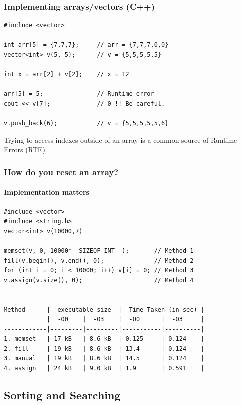 \documentclass{beamer}
\begin{document}
\begin{frame}[fragile]
  \frametitle{Implementing arrays/vectors (C++)}
  {\small
\begin{verbatim}
#include <vector>         

int arr[5] = {7,7,7};     // arr = {7,7,7,0,0}
vector<int> v(5, 5);      // v = {5,5,5,5,5}

int x = arr[2] + v[2];    // x = 12

arr[5] = 5;               // Runtime error
cout << v[7];             // 0 !! Be careful.

v.push_back(6);           // v = {5,5,5,5,5,6}
\end{verbatim}
  }

  \begin{alertblock}{}
    Trying to access indexes outside of an array is a common source of
    Runtime Errors (RTE)
  \end{alertblock}

\end{frame}

\begin{frame}[fragile]
  \frametitle{How do you reset an array?}
  \framesubtitle{Implementation matters}
{\small
\begin{verbatim}
#include <vector>
#include <string.h>
vector<int> v(10000,7)

memset(v, 0, 10000*__SIZEOF_INT__);       // Method 1
fill(v.begin(), v.end(), 0);              // Method 2
for (int i = 0; i < 10000; i++) v[i] = 0; // Method 3
v.assign(v.size(), 0);                    // Method 4


Method      |  executable size  |  Time Taken (in sec) |
            |  -O0    |  -O3    |  -O0      |  -O3     |  
------------|---------|---------|-----------|----------|
1. memset   | 17 kB   | 8.6 kB  | 0.125     | 0.124    |
2. fill     | 19 kB   | 8.6 kB  | 13.4      | 0.124    |
3. manual   | 19 kB   | 8.6 kB  | 14.5      | 0.124    |
4. assign   | 24 kB   | 9.0 kB  | 1.9       | 0.591    |
\end{verbatim}
}
\end{frame}

\subsection{Sorting and Searching}
\end{document}
